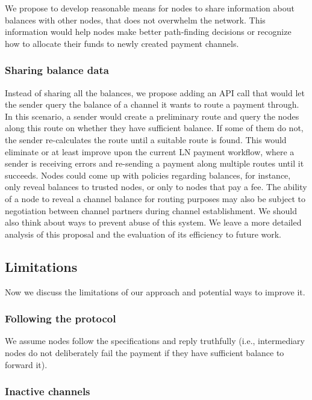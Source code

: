 We propose to develop reasonable means for nodes to share information about balances with other nodes, that does not overwhelm the network.
This information would help nodes make better path-finding decisions or recognize how to allocate their funds to newly created payment channels.

\subsubsection{Sharing balance data}
Instead of sharing all the balances, we propose adding an API call that would let the sender query the balance of a channel it wants to route a payment through.
In this scenario, a sender would create a preliminary route and query the nodes along this route on whether they have sufficient balance.
If some of them do not, the sender re-calculates the route until a suitable route is found.
This would eliminate or at least improve upon the current LN payment workflow, where a sender is receiving errors and re-sending a payment along multiple routes until it succeeds.
Nodes could come up with policies regarding balances, for instance, only reveal balances to trusted nodes, or only to nodes that pay a fee.
The ability of a node to reveal a channel balance for routing purposes may also be subject to negotiation between channel partners during channel establishment.
We should also think about ways to prevent abuse of this system.
We leave a more detailed analysis of this proposal and the evaluation of its efficiency to future work.



\subsection{Limitations}

Now we discuss the limitations of our approach and potential ways to improve it.

\subsubsection{Following the protocol}
We assume nodes follow the specifications and reply truthfully (i.e., intermediary nodes do not deliberately fail the payment if they have sufficient balance to forward it).

\subsubsection{Inactive channels}

